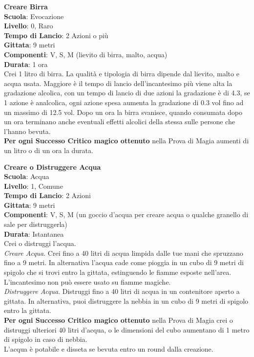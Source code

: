 \begin{multicols}{2}
\medskip\textbf{Creare Birra}\\
\textbf{Scuola}: Evocazione\\
\textbf{Livello}: 0, Raro\\
\textbf{Tempo di Lancio}: 2 Azioni o più\\
\textbf{Gittata}: 9 metri\\
\textbf{Componenti}: V, S, M (lievito di birra, malto, acqua)\\
\textbf{Durata}: 1 ora\\
Crei 1 litro di birra. La qualità e tipologia di birra dipende dal lievito, malto e acqua usata.
Maggiore è il tempo di lancio dell'incantesimo più viene alta la gradazione alcolica, con un tempo di lancio di due azioni la gradazione è di 4.3, se 1 azione è analcolica, ogni azione spesa aumenta la gradazione di 0.3 vol fino ad un massimo di 12.5 vol.
Dopo un ora la birra svanisce, quando consumata dopo un ora terminano anche eventuali effetti alcolici della stessa sulle persone che l'hanno bevuta.\\
\textbf{Per ogni Successo Critico magico ottenuto} nella Prova di Magia aumenti di un litro o di un ora la durata.

\medskip\textbf{Creare o Distruggere Acqua}\\
\textbf{Scuola}: Acqua\\
\textbf{Livello}: 1, Comune\\
\textbf{Tempo di Lancio}: 2 Azioni\\
\textbf{Gittata}: 9 metri\\
\textbf{Componenti}: V, S, M (un goccio d'acqua per creare acqua o qualche granello di sale per distruggerla)\\
\textbf{Durata}: Istantanea\\
Crei o distruggi l'acqua.\\
\textit{Creare Acqua}. Crei fino a 40 litri di acqua limpida dalle tue mani che spruzzano fino a 9 metri. In alternativa l'acqua cade come pioggia in un cubo di 9 metri di spigolo che si trovi entro la gittata, estinguendo le fiamme esposte nell'area.\\
L'incantesimo non può essere usato su fiamme magiche.\\
\textit{Distruggere Acqua}. Distruggi fino a 40 litri di acqua in un contenitore aperto a gittata. In alternativa, puoi distruggere la nebbia in un cubo di 9 metri di spigolo entro la gittata.\\
\textbf{Per ogni Successo Critico magico ottenuto} nella Prova di Magia crei o distruggi ulteriori 40 litri d'acqua, o le dimensioni del cubo aumentano di 1 metro di spigolo in caso di nebbia.\\
L'acqua è potabile e disseta se bevuta entro un round dalla creazione.


\end{multicols}
